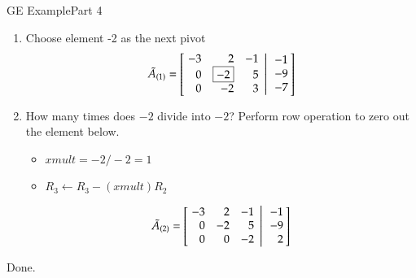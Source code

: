 \documentclass[10pt]{beamer}
\begin{document}
\begin{frame}{GE Example}{Part 4}
\begin{enumerate}
    \item[5.] Choose element -2 as the next pivot 
    \begin{equation*}
        \tilde{A}_{(1)} = \left[
               \left.\negthickspace\begin{array}{rrr}  -3 &  2 & -1 \\
                                                        0 & \boxed{-2} &  5 \\
                                                        0 & -2 &  3 \end{array}
               \right|\begin{array}{r} -1 \\ -9 \\ -7 \end{array}\negthickspace\right]
    \end{equation*}

    \item[6.] How many times does $\boxed{-2}$ divide into $-2$? Perform row operation to zero out the element below.
    \begin{itemize}
        \item $xmult = -2/-2=1$
        \item $R_3\leftarrow R_3 -(xmult)R_2$
    \end{itemize}

\begin{equation*}
    \tilde{A}_{(2)} = \left[
           \left.\negthickspace\begin{array}{rrr}  -3 &  2 & -1 \\
                                                    0 & -2 &  5 \\
                                                    0 &  0 & -2 \end{array}
           \right|\begin{array}{r} -1 \\ -9 \\ 2 \end{array}\negthickspace\right]
\end{equation*}
\end{enumerate}
\vfill
\begin{center}
    Done.
\end{center}
\end{frame}
\end{document}
